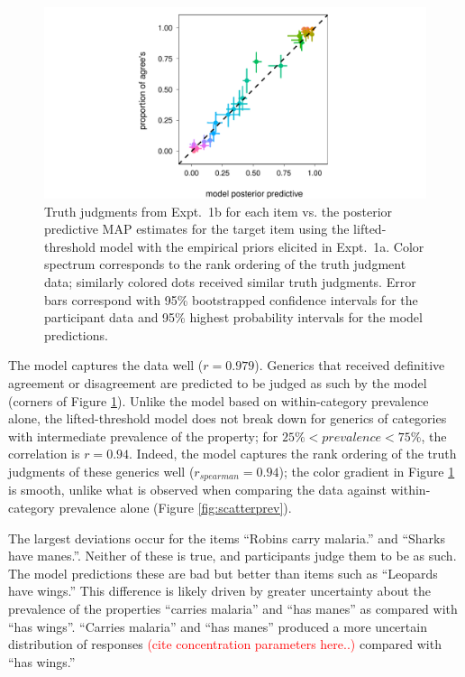 \documentclass[10pt,letterpaper]{article}
\newcommand{\red}[1]{\textcolor{Red}{#1}}
\begin{document}
\begin{figure}
\centering
    \includegraphics[width=\columnwidth]{tj_n100_tjVsPostpred_95hdi.pdf}
    \caption{Truth judgments from Expt.~1b for each item vs. the posterior predictive MAP estimates for the target item using the lifted-threshold model with the empirical priors elicited in Expt.~1a. Color spectrum corresponds to the rank ordering of the truth judgment data; similarly colored dots received similar truth judgments. Error bars correspond with 95\% bootstrapped confidence intervals for the participant data and 95\% highest probability intervals for the model predictions.}
  \label{fig:modeldataScatter}
\end{figure}

The model captures the data well ($r=0.979$). 
Generics that received definitive agreement or disagreement are predicted to be judged as such by the model (corners of Figure \ref{fig:modeldataScatter}). Unlike the model based on within-category prevalence alone, the lifted-threshold model does not break down for generics of categories with intermediate prevalence of the property; for $ 25\% < prevalence < 75\%$, the correlation is $r=0.94$. Indeed, the model captures the rank ordering of the truth judgments of these generics well ($r_{spearman} = 0.94$); the color gradient in Figure \ref{fig:modeldataScatter} is smooth, unlike what is observed when comparing the data against within-category prevalence alone (Figure \ref{fig:scatterprev}). 

The largest deviations occur for the items ``Robins carry malaria.'' and ``Sharks have manes.''. 
Neither of these is true, and participants judge them to be as such.
The model predictions these are bad but better than items such as ``Leopards have wings.'' 
This difference is likely driven by greater uncertainty about the prevalence of the properties ``carries malaria'' and ``has manes'' as compared with ``has wings''.
``Carries malaria'' and ``has manes'' produced a more uncertain distribution of responses \red{(cite concentration parameters here..)} compared with ``has wings.''
\end{document}
